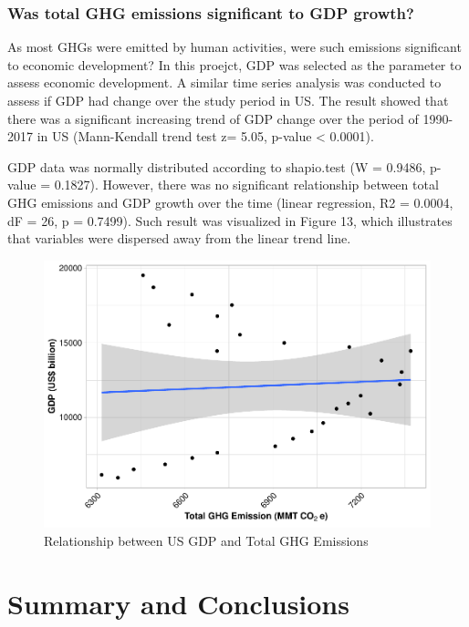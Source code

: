 \documentclass[12pt,]{article}
\begin{document}
\subsubsection{Was total GHG emissions significant to GDP
growth?}\label{was-total-ghg-emissions-significant-to-gdp-growth}

As most GHGs were emitted by human activities, were such emissions
significant to economic development? In this proejct, GDP was selected
as the parameter to assess economic development. A similar time series
analysis was conducted to assess if GDP had change over the study period
in US. The result showed that there was a significant increasing trend
of GDP change over the period of 1990-2017 in US (Mann-Kendall trend
test z= 5.05, p-value \textless{} 0.0001).

GDP data was normally distributed according to shapio.test (W = 0.9486,
p-value = 0.1827). However, there was no significant relationship
between total GHG emissions and GDP growth over the time (linear
regression, R2 = 0.0004, dF = 26, p = 0.7499). Such result was
visualized in Figure 13, which illustrates that variables were dispersed
away from the linear trend line.

\begin{figure}
\centering
\includegraphics{Project_Code_files/figure-latex/unnamed-chunk-33-1.pdf}
\caption{Relationship between US GDP and Total GHG Emissions}
\end{figure}

\newpage

\section{Summary and Conclusions}\label{summary-and-conclusions}
\end{document}
